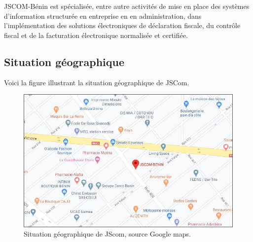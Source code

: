 \documentclass[a4paper,12pt,french]{report} %
\begin{document}
	JSCOM-Bénin est spécialisée, entre autre activités de mise en place des systèmes d'information structurée en entreprise en en administration, dans l'implémentation des solutions électroniques de déclaration fiscale, du contrôle fiscal et de la facturation électronique normalisée et certifiée.
		
	\subsection{Situation géographique}
		Voici la figure illustrant la situation géographique de JSCom. 
	\begin{figure}[H]
	\centering
	\includegraphics[scale=0.8]{figure/jscom-map.png}		
	\caption{Situation géographique de JScom, source Google maps.}		
	\label{Situation géographique de JScom}
	\end{figure}
		
		
\end{document}
